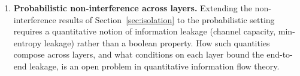 \documentclass[11pt, a4paper]{article}
\theoremstyle{definition}
\theoremstyle{plain}
\theoremstyle{remark}
\begin{document}
\begin{enumerate}
  \item \textbf{Probabilistic non-interference across layers.}
        Extending the non-interference results of Section~\ref{sec:isolation}
        to the probabilistic setting requires a quantitative notion of
        information leakage (channel capacity, min-entropy leakage) rather
        than a boolean property. How such quantities compose across layers,
        and what conditions on each layer bound the end-to-end leakage, is
        an open problem in quantitative information flow theory.
\end{enumerate}




\end{document}
